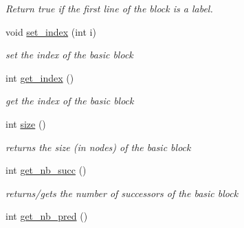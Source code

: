 \begin{DoxyCompactItemize}
\begin{DoxyCompactList}\small\item\em Return true if the first line of the block is a label. \end{DoxyCompactList}\item 
\hypertarget{class_basic__block_a5bdba6b1e3307dc03c38b8249c4b3fa8}{void \hyperlink{class_basic__block_a5bdba6b1e3307dc03c38b8249c4b3fa8}{set\-\_\-index} (int i)}\label{class_basic__block_a5bdba6b1e3307dc03c38b8249c4b3fa8}

\begin{DoxyCompactList}\small\item\em set the index of the basic block \end{DoxyCompactList}\item 
\hypertarget{class_basic__block_a8cb196904537be8fb0474afce7c769c1}{int \hyperlink{class_basic__block_a8cb196904537be8fb0474afce7c769c1}{get\-\_\-index} ()}\label{class_basic__block_a8cb196904537be8fb0474afce7c769c1}

\begin{DoxyCompactList}\small\item\em get the index of the basic block \end{DoxyCompactList}\item 
\hypertarget{class_basic__block_a5574d52e3ecdbf36e52c42c31bfc73db}{int \hyperlink{class_basic__block_a5574d52e3ecdbf36e52c42c31bfc73db}{size} ()}\label{class_basic__block_a5574d52e3ecdbf36e52c42c31bfc73db}

\begin{DoxyCompactList}\small\item\em returns the size (in nodes) of the basic block \end{DoxyCompactList}\item 
\hypertarget{class_basic__block_a3ccc47a22b9d5d9e932862ab37783225}{int \hyperlink{class_basic__block_a3ccc47a22b9d5d9e932862ab37783225}{get\-\_\-nb\-\_\-succ} ()}\label{class_basic__block_a3ccc47a22b9d5d9e932862ab37783225}

\begin{DoxyCompactList}\small\item\em returns/gets the number of successors of the basic block \end{DoxyCompactList}\item 
\hypertarget{class_basic__block_ade6f71459e5b54108022a16a4a6a00cb}{int \hyperlink{class_basic__block_ade6f71459e5b54108022a16a4a6a00cb}{get\-\_\-nb\-\_\-pred} ()}\label{class_basic__block_ade6f71459e5b54108022a16a4a6a00cb}


\end{DoxyCompactItemize}
